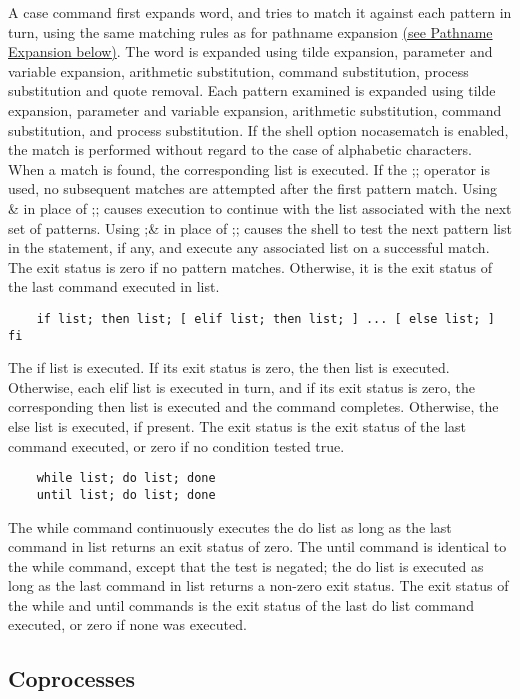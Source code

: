A case command first expands word, and tries to match it against each pattern in turn, using the same matching rules as for pathname expansion \hyperref[sec:pathnameexpansion]{(see Pathname Expansion below)}. The word is expanded using tilde expansion, parameter and variable expansion, arithmetic substitution, command substitution, process substitution and quote removal. Each pattern examined is expanded using tilde expansion, parameter and variable expansion, arithmetic substitution, command substitution, and process substitution. If the shell option nocasematch is enabled, the match is performed without regard to the case of alphabetic characters. When a match is found, the corresponding list is executed. If the ;; operator is used, no subsequent matches are attempted after the first pattern match. Using \& in place of ;; causes execution to continue with the list associated with the next set of patterns. Using ;\& in place of ;; causes the shell to test the next pattern list in the statement, if any, and execute any associated list on a successful match. The exit status is zero if no pattern matches. Otherwise, it is the exit status of the last command executed in list.
\begin{lstlisting}
    if list; then list; [ elif list; then list; ] ... [ else list; ] fi
\end{lstlisting}\label{lst:if}

The if list is executed. If its exit status is zero, the then list is executed. Otherwise, each elif list is executed in turn, and if its exit status is zero, the corresponding then list is executed and the command completes. Otherwise, the else list is executed, if present. The exit status is the exit status of the last command executed, or zero if no condition tested true.
\begin{lstlisting}
    while list; do list; done
    until list; do list; done
\end{lstlisting}
The while command continuously executes the do list as long as the last command in list returns an exit status of zero. The until command is identical to the while command, except that the test is negated; the do list is executed as long as the last command in list returns a non-zero exit status. The exit status of the while and until commands is the exit status of the last do list command executed, or zero if none was executed.

\subsection{Coprocesses}\label{sec:coprocesses}

